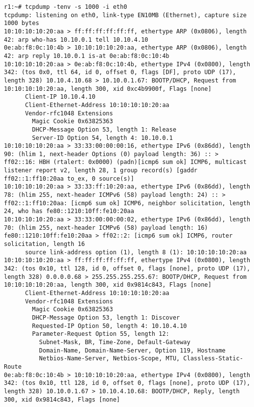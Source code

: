 \documentclass[a4paper,12pt]{article}
\begin{document}
\begin{Verbatim}
r1:~# tcpdump -tenv -s 1000 -i eth0
tcpdump: listening on eth0, link-type EN10MB (Ethernet), capture size 1000 bytes
10:10:10:10:20:aa > ff:ff:ff:ff:ff:ff, ethertype ARP (0x0806), length 42: arp who-has 10.10.0.1 tell 10.10.4.10
0e:ab:f8:0c:10:4b > 10:10:10:10:20:aa, ethertype ARP (0x0806), length 42: arp reply 10.10.0.1 is-at 0e:ab:f8:0c:10:4b
10:10:10:10:20:aa > 0e:ab:f8:0c:10:4b, ethertype IPv4 (0x0800), length 342: (tos 0x0, ttl 64, id 0, offset 0, flags [DF], proto UDP (17), length 328) 10.10.4.10.68 > 10.10.0.1.67: BOOTP/DHCP, Request from 10:10:10:10:20:aa, length 300, xid 0xc4b9900f, Flags [none]
	  Client-IP 10.10.4.10
	  Client-Ethernet-Address 10:10:10:10:20:aa
	  Vendor-rfc1048 Extensions
	    Magic Cookie 0x63825363
	    DHCP-Message Option 53, length 1: Release
	    Server-ID Option 54, length 4: 10.10.0.1
10:10:10:10:20:aa > 33:33:00:00:00:16, ethertype IPv6 (0x86dd), length 90: (hlim 1, next-header Options (0) payload length: 36) :: > ff02::16: HBH (rtalert: 0x0000) (padn)[icmp6 sum ok] ICMP6, multicast listener report v2, length 28, 1 group record(s) [gaddr ff02::1:ff10:20aa to_ex, 0 source(s)]
10:10:10:10:20:aa > 33:33:ff:10:20:aa, ethertype IPv6 (0x86dd), length 78: (hlim 255, next-header ICMPv6 (58) payload length: 24) :: > ff02::1:ff10:20aa: [icmp6 sum ok] ICMP6, neighbor solicitation, length 24, who has fe80::1210:10ff:fe10:20aa
10:10:10:10:20:aa > 33:33:00:00:00:02, ethertype IPv6 (0x86dd), length 70: (hlim 255, next-header ICMPv6 (58) payload length: 16) fe80::1210:10ff:fe10:20aa > ff02::2: [icmp6 sum ok] ICMP6, router solicitation, length 16
	  source link-address option (1), length 8 (1): 10:10:10:10:20:aa
10:10:10:10:20:aa > ff:ff:ff:ff:ff:ff, ethertype IPv4 (0x0800), length 342: (tos 0x10, ttl 128, id 0, offset 0, flags [none], proto UDP (17), length 328) 0.0.0.0.68 > 255.255.255.255.67: BOOTP/DHCP, Request from 10:10:10:10:20:aa, length 300, xid 0x9814c843, Flags [none]
	  Client-Ethernet-Address 10:10:10:10:20:aa
	  Vendor-rfc1048 Extensions
	    Magic Cookie 0x63825363
	    DHCP-Message Option 53, length 1: Discover
	    Requested-IP Option 50, length 4: 10.10.4.10
	    Parameter-Request Option 55, length 12: 
	      Subnet-Mask, BR, Time-Zone, Default-Gateway
	      Domain-Name, Domain-Name-Server, Option 119, Hostname
	      Netbios-Name-Server, Netbios-Scope, MTU, Classless-Static-Route
0e:ab:f8:0c:10:4b > 10:10:10:10:20:aa, ethertype IPv4 (0x0800), length 342: (tos 0x10, ttl 128, id 0, offset 0, flags [none], proto UDP (17), length 328) 10.10.0.1.67 > 10.10.4.10.68: BOOTP/DHCP, Reply, length 300, xid 0x9814c843, Flags [none]

\end{Verbatim}
\end{document}
